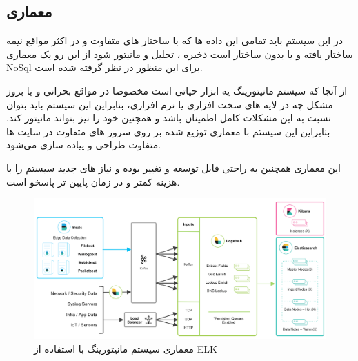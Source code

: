 \documentclass{llncs}
\begin{document}
\newpage

\subsection{معماری}

در این سیستم باید تمامی این داده ها که با ساختار های متفاوت و در اکثر مواقع نیمه ساختار یافته و یا بدون ساختار است ذخیره ، تحلیل و مانیتور شود از این رو یک معماری NoSql برای این منظور در نظر گرفته شده است.

از آنجا که سیستم مانیتورینگ یه ابزار حیاتی است مخصوصا در مواقع بحرانی و یا بروز مشکل چه در لایه های سخت افزاری یا نرم افزاری، بنابراین این سیستم باید بتوان نسبت به این مشکلات کامل اطمینان باشد و همچنین خود را نیز بتواند مانیتور کند.
بنابراین این سیستم با معماری توزیع شده بر روی سرور های متفاوت در سایت ها متفاوت طراحی و پیاده سازی می‌شود.

این معماری همچنین به راحتی قابل توسعه و تغییر بوده و نیاز های جدید سیستم را با هزینه کمتر و در زمان پایین تر پاسخو است.

\begin{figure}
\centering
\includegraphics[width=1\textwidth]{mahi/bi-5.png}
\centering
\caption{معماری سیستم مانیتورینگ با استفاده از ELK}
\label{fig:bi-5}
\end{figure}
\end{document}

